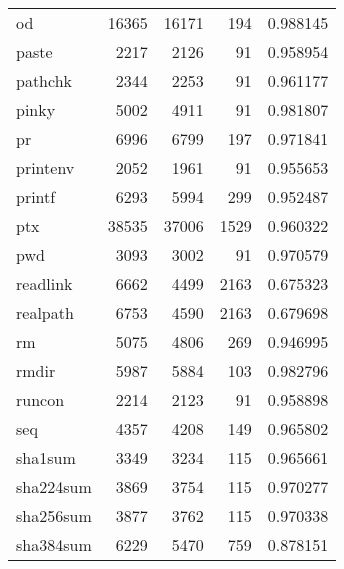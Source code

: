\begin{longtable}{lrrrr}
od        &                    16365 &        16171 &           194 &                 0.988145 \\
paste     &                     2217 &         2126 &            91 &                 0.958954 \\
pathchk   &                     2344 &         2253 &            91 &                 0.961177 \\
pinky     &                     5002 &         4911 &            91 &                 0.981807 \\
pr        &                     6996 &         6799 &           197 &                 0.971841 \\
printenv  &                     2052 &         1961 &            91 &                 0.955653 \\
printf    &                     6293 &         5994 &           299 &                 0.952487 \\
ptx       &                    38535 &        37006 &          1529 &                 0.960322 \\
pwd       &                     3093 &         3002 &            91 &                 0.970579 \\
readlink  &                     6662 &         4499 &          2163 &                 0.675323 \\
realpath  &                     6753 &         4590 &          2163 &                 0.679698 \\
rm        &                     5075 &         4806 &           269 &                 0.946995 \\
rmdir     &                     5987 &         5884 &           103 &                 0.982796 \\
runcon    &                     2214 &         2123 &            91 &                 0.958898 \\
seq       &                     4357 &         4208 &           149 &                 0.965802 \\
sha1sum   &                     3349 &         3234 &           115 &                 0.965661 \\
sha224sum &                     3869 &         3754 &           115 &                 0.970277 \\
sha256sum &                     3877 &         3762 &           115 &                 0.970338 \\
sha384sum &                     6229 &         5470 &           759 &                 0.878151 \\

\end{longtable}
